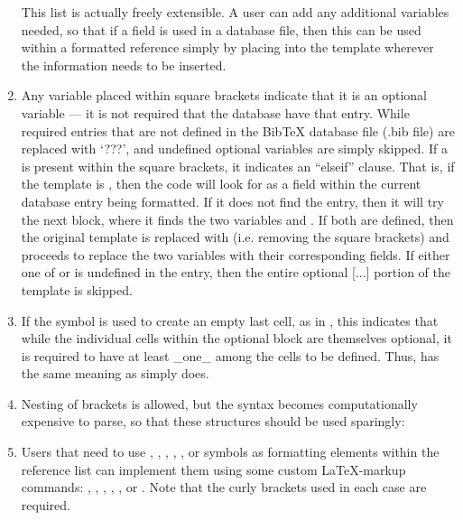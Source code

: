 \documentclass[letterpaper,10pt,english]{sphinxmanual}
\begin{document}
\begin{enumerate}
This list is actually freely extensible. A user can add any additional variables needed, so that if a  field is used in a  database file, then this can be used within a formatted reference simply by placing  into the template wherever the information needs to be inserted.

\item {} 
Any variable placed within square brackets \code{{[}{]}} indicate that it is an optional variable --- it is not required that the database have that entry. While required entries that are not defined in the BibTeX database file (.bib file) are replaced with `???', and undefined optional variables are simply skipped. If a \code{\textbar{}} is present within the square brackets, it indicates an ``elseif'' clause. That is, if the template is , then the code will look for  as a field within the current database entry being formatted. If it does not find the entry, then it will try the next block, where it finds the two variables  and . If both are defined, then the original template  is replaced with  (i.e. removing the square brackets) and proceeds to replace the two variables with their corresponding fields. If either one of  or  is undefined in the entry, then the entire optional {[}...{]} portion of the template is skipped.

\item {} 
If the \code{\textbar{}} symbol is used to create an empty last cell, as in , this indicates that while the individual cells within the optional block are themselves optional, it is required to have at least \_one\_ among the cells to be defined. Thus,  has the same meaning as simply  does.

\item {} 
Nesting of \code{{[}{]}} brackets is allowed, but the syntax becomes computationally expensive to parse, so that these structures should be used sparingly:

\item {} 
Users that need to use \code{{[}}, \code{{]}}, \code{\#}, \code{\textless{}}, \code{\textgreater{}}, or \code{\textbar{}} symbols as formatting elements within the reference list can implement them using some custom LaTeX-markup commands: , , , , , or . Note that the curly brackets used in each case are required.


\end{enumerate}
\end{document}
